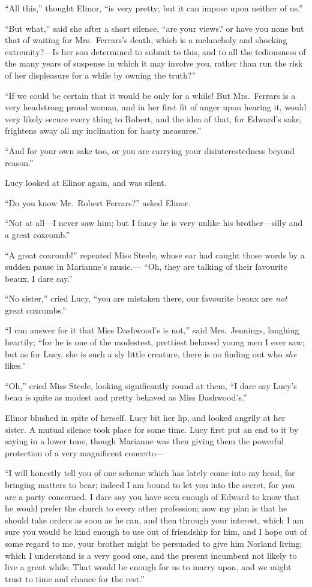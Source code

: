 ``All this,'' thought Elinor, ``is very pretty;
but it can impose upon neither of us.''

``But what,'' said she after a short silence,
``are your views? or have you none but that of waiting for
Mrs.\ Ferrars's death, which is a melancholy and shocking
extremity?---Is her son determined to submit to this,
and to all the tediousness of the many years of suspense
in which it may involve you, rather than run the risk
of her displeasure for a while by owning the truth?''

``If we could be certain that it would be only
for a while!  But Mrs.\ Ferrars is a very headstrong
proud woman, and in her first fit of anger upon hearing
it, would very likely secure every thing to Robert,
and the idea of that, for Edward's sake, frightens away
all my inclination for hasty measures.''

``And for your own sake too, or you are carrying
your disinterestedness beyond reason.''

Lucy looked at Elinor again, and was silent.

``Do you know Mr.\ Robert Ferrars?'' asked Elinor.

``Not at all---I never saw him; but I fancy he
is very unlike his brother---silly and a great coxcomb.''

``A great coxcomb!'' repeated Miss Steele, whose ear had
caught those words by a sudden pause in Marianne's music.---%
``Oh, they are talking of their favourite beaux, I dare say.''

``No sister,'' cried Lucy, ``you are mistaken there, our
favourite beaux are \emph{not} great coxcombs.''

``I can answer for it that Miss Dashwood's is not,''
said Mrs.\ Jennings, laughing heartily; ``for he is one
of the modestest, prettiest behaved young men I ever saw;
but as for Lucy, she is such a sly little creature,
there is no finding out who \emph{she} likes.''

``Oh,'' cried Miss Steele, looking significantly round
at them, ``I dare say Lucy's beau is quite as modest
and pretty behaved as Miss Dashwood's.''

Elinor blushed in spite of herself.  Lucy bit her lip,
and looked angrily at her sister.  A mutual silence took
place for some time.  Lucy first put an end to it by saying
in a lower tone, though Marianne was then giving them
the powerful protection of a very magnificent concerto---%

``I will honestly tell you of one scheme which has
lately come into my head, for bringing matters to bear;
indeed I am bound to let you into the secret, for you
are a party concerned.  I dare say you have seen enough
of Edward to know that he would prefer the church to every
other profession; now my plan is that he should take
orders as soon as he can, and then through your interest,
which I am sure you would be kind enough to use out of
friendship for him, and I hope out of some regard to me,
your brother might be persuaded to give him Norland living;
which I understand is a very good one, and the present
incumbent not likely to live a great while.  That would
be enough for us to marry upon, and we might trust to time
and chance for the rest.''

